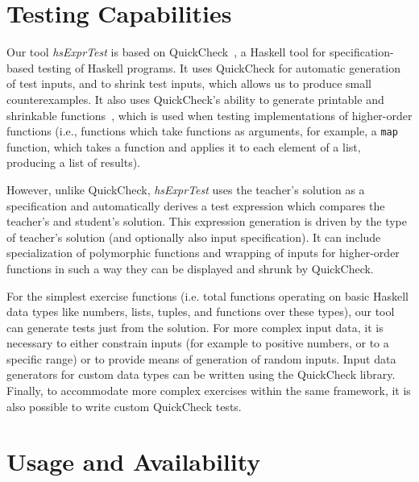 \documentclass[sigconf]{acmart} %
\newcommand{\hsExprTest}{\textit{hsExprTest}}
\begin{document}


\maketitle

\section{Testing Capabilities}

Our tool \hsExprTest{} is based on QuickCheck~\cite{Koen2000}, a Haskell tool for
specification-based testing of Haskell programs.
It uses QuickCheck for automatic generation of test inputs, and to shrink test
inputs, which allows us to produce small counterexamples.
It also uses QuickCheck's ability to generate printable and shrinkable
functions~\cite{Koen2012}, which is used when testing implementations of
higher-order functions (i.e., functions which take functions as arguments, for
example, a \texttt{map} function, which takes a function and applies it to each
element of a list, producing a list of results).

However, unlike QuickCheck, \hsExprTest{} uses the teacher's solution as a
specification and automatically derives a test expression which compares the
teacher's and student's solution.
This expression generation is driven by the type of teacher's solution (and
optionally also input specification).
It can include specialization of
polymorphic functions and wrapping of inputs for higher-order functions in such
a way they can be displayed and shrunk by QuickCheck.

For the simplest exercise functions (i.e. total functions operating on basic
Haskell data types like numbers, lists, tuples, and functions over these
types), our tool can generate tests just from the solution.
For more complex input data, it is necessary to either constrain inputs
(for example to positive numbers, or to a specific range) or to provide means
of generation of random inputs.
Input data generators for custom data types can be written using the QuickCheck
library.
Finally, to accommodate more complex exercises within the same framework, it is
also possible to write custom QuickCheck tests.

\section{Usage and Availability}
\end{document}

